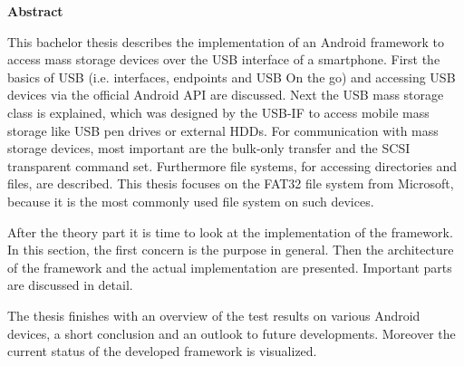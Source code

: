

\clearemptydoublepage
{}
{}	





\vspace*{2cm}
\begin{center}
{\Large \bf Abstract}
\end{center}
\vspace{1cm}

This bachelor thesis describes the implementation of an Android framework to access mass storage devices over the USB interface of a smartphone. First the basics of USB (i.e. interfaces, endpoints and USB On the go) and accessing USB devices via the official Android API are discussed. Next the USB mass storage class is explained, which was designed by the USB-IF to access mobile mass storage like USB pen drives or external HDDs. For communication with mass storage devices, most important are the bulk-only transfer and the SCSI transparent command set. Furthermore file systems, for accessing directories and files, are described. This thesis focuses on the FAT32 file system from Microsoft, because it is the most commonly used file system on such devices.

After the theory part it is time to look at the implementation of the framework. In this section, the first concern is the purpose in general. Then the architecture of the framework and the actual implementation are presented. Important parts are discussed in detail.

The thesis finishes with an overview of the test results on various Android devices, a short conclusion and an outlook to future developments. Moreover the current status of the developed framework is visualized. 